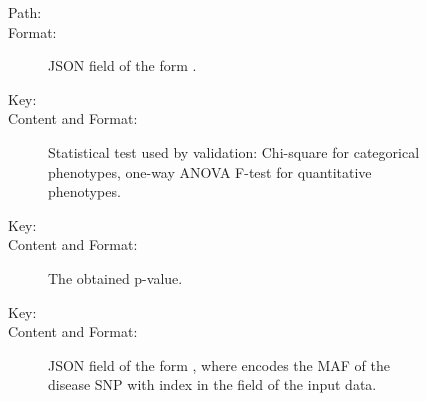 \documentclass[a4paper,10pt,english]{sphinxhowto}
\begin{document}
\begin{description}
\item[{}] \leavevmode\begin{description}
\item[{}] \leavevmode\begin{description}
\item[{Path:}] \leavevmode
{}

\item[{Format:}] \leavevmode
JSON field of the form .

\end{description}

\item[{}] \leavevmode\begin{description}
\item[{Key:}] \leavevmode
{}

\item[{Content and Format:}] \leavevmode
Statistical test used by validation: Chi-square for categorical phenotypes, one-way ANOVA F-test for
quantitative phenotypes.

\end{description}

\item[{}] \leavevmode\begin{description}
\item[{Key:}] \leavevmode
{}

\item[{Content and Format:}] \leavevmode
The obtained p-value.

\end{description}

\item[{}] \leavevmode\begin{description}
\item[{Key:}] \leavevmode
{}

\item[{Content and Format:}] \leavevmode
JSON field of the form , where  encodes the MAF of
the disease SNP with index  in the  field of the input data.


\end{description}
\end{description}
\end{description}
\end{document}
